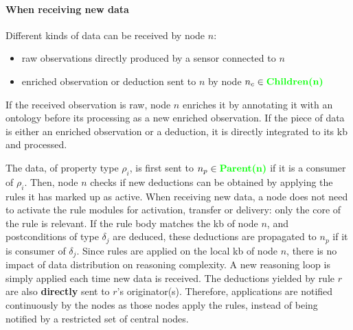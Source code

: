 \documentclass{iosart2c}
\newcommand{\added}[1]{\textcolor{green}{\textbf{#1}}}
\begin{document}
\paragraph{When receiving new data}

Different kinds of data can be received by node $n$:
\begin{itemize}
	\item raw observations directly produced by a sensor connected to $n$
	\item enriched observation or deduction sent to $n$ by node $n_c \in \added{Children(n)}$
\end{itemize}
If the received observation is raw, node $n$ enriches it by annotating it with an ontology before its processing as a new enriched observation. 
If the piece of data is either an enriched observation or a deduction, it is directly integrated to its \gls{kb} and processed. 

The data, of property type $\rho_{i}$, is first sent to $n_p\in \added{Parent(n)}$ if it is a consumer of $\rho_{i}$. 
Then, node $n$ checks if new deductions can be obtained by applying the rules it has marked up as active.
When receiving new data, a node does not need to activate the rule modules for activation, transfer or delivery: only the core of the rule is relevant.
If the rule body matches the \gls{kb} of node $n$, and postconditions of type $\delta_{j}$ are deduced, these deductions are propagated to $n_p$ if it is consumer of $\delta_{j}$.
Since rules are applied on the local \gls{kb} of node $n$, there is no impact of data distribution on reasoning complexity. 
A new reasoning loop is simply applied each time new data is received.
The deductions yielded by rule $r$ are also \textbf{directly} sent to $r$'s originator(s).
Therefore, applications are notified continuously by the nodes as those nodes apply the rules, instead of being notified by a restricted set of central nodes.

%	
\end{document}
